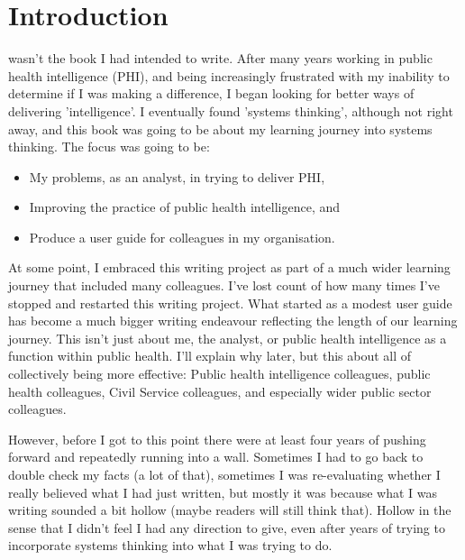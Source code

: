\chapter*{Introduction}



 wasn't the book I had intended to write. After many years working in public health intelligence (PHI), and being increasingly frustrated with my inability to determine if I was making a difference, I began looking for better ways of delivering 'intelligence'. I eventually found 'systems thinking', although not right away, and this book was going to be about my learning journey into systems thinking. The focus was going to be:

\begin{itemize}[leftmargin=1 cm]
	\item My problems, as an analyst, in trying to deliver PHI,
	\item Improving the practice of public health intelligence, and
	\item Produce a user guide for colleagues in my organisation. \end{itemize}

At some point, I embraced this writing project as part of a much wider learning journey that included many colleagues. I've lost count of how many times I've stopped and restarted this writing project. What started as a modest user guide has become a much bigger writing endeavour reflecting the length of our learning journey. This isn't just about me, the analyst, or public health intelligence as a function within public health. I'll explain why later, but this about all of collectively being more effective: Public health intelligence colleagues, public health colleagues, Civil Service colleagues, and especially wider public sector colleagues.

However, before I got to this point there were at least four years of pushing forward and repeatedly running into a wall. Sometimes I had to go back to double check my facts (a lot of that), sometimes I was re-evaluating whether I really believed what I had just written, but mostly it was because what I was writing sounded a bit hollow (maybe readers will still think that). Hollow in the sense that I didn't feel I had any direction to give, even after years of trying to incorporate systems thinking into what I was trying to do.

